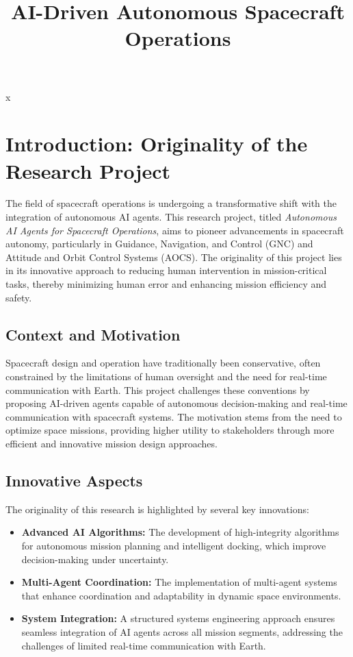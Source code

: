 \documentclass[a4paper,12pt]{article}
\title{AI-Driven Autonomous Spacecraft Operations}
\author{}
\date{}
\begin{document}
\maketitle
\tableofcontents
\newpage

x
\section{Introduction: Originality of the Research Project}

The field of spacecraft operations is undergoing a transformative shift with the integration of autonomous AI agents. This research project, titled \textit{Autonomous AI Agents for Spacecraft Operations}, aims to pioneer advancements in spacecraft autonomy, particularly in Guidance, Navigation, and Control (GNC) and Attitude and Orbit Control Systems (AOCS). The originality of this project lies in its innovative approach to reducing human intervention in mission-critical tasks, thereby minimizing human error and enhancing mission efficiency and safety.

\subsection{Context and Motivation}

Spacecraft design and operation have traditionally been conservative, often constrained by the limitations of human oversight and the need for real-time communication with Earth. This project challenges these conventions by proposing AI-driven agents capable of autonomous decision-making and real-time communication with spacecraft systems. The motivation stems from the need to optimize space missions, providing higher utility to stakeholders through more efficient and innovative mission design approaches.

\subsection{Innovative Aspects}

The originality of this research is highlighted by several key innovations:

\begin{itemize}
    \item \textbf{Advanced AI Algorithms:} The development of high-integrity algorithms for autonomous mission planning and intelligent docking, which improve decision-making under uncertainty.
    \item \textbf{Multi-Agent Coordination:} The implementation of multi-agent systems that enhance coordination and adaptability in dynamic space environments.
    \item \textbf{System Integration:} A structured systems engineering approach ensures seamless integration of AI agents across all mission segments, addressing the challenges of limited real-time communication with Earth.
\end{itemize}
\end{document}

